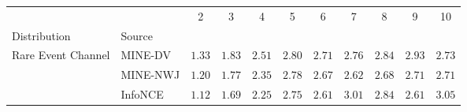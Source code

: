 \begin{tabular}{llccccccccc}
\toprule
 &  & 2 & 3 & 4 & 5 & 6 & 7 & 8 & 9 & 10 \\
Distribution & Source &  &  &  &  &  &  &  &  &  \\
\midrule
\multirow[l]{3}{*}{Rare Event Channel} & MINE-DV & $ 1.33 $ & $ 1.83 $ & $ 2.51 $ & $ 2.80 $ & $ 2.71 $ & $ 2.76 $ & $ 2.84 $ & $ 2.93 $ & $ 2.73 $ \\
 & MINE-NWJ & $ 1.20 $ & $ 1.77 $ & $ 2.35 $ & $ 2.78 $ & $ 2.67 $ & $ 2.62 $ & $ 2.68 $ & $ 2.71 $ & $ 2.71 $ \\
 & InfoNCE & $ 1.12 $ & $ 1.69 $ & $ 2.25 $ & $ 2.75 $ & $ 2.61 $ & $ 3.01 $ & $ 2.84 $ & $ 2.61 $ & $ 3.05 $ \\
\bottomrule
\end{tabular}
